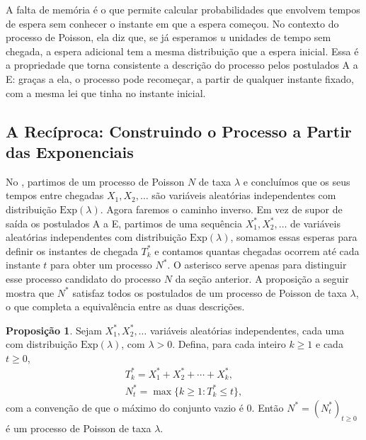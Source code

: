 \documentclass[12pt,portuguese]{article}
\theoremstyle{definition}
\newtheorem{proposition}[proposition]{Proposição}
\theoremstyle{plainexercise}
\theoremstyle{starredexercise}
\theoremstyle{definition}
\begin{document}
A falta de memória é o que permite calcular probabilidades que envolvem
tempos de espera sem conhecer o instante em que a espera começou. No
contexto do processo de Poisson, ela diz que, se já esperamos $u$ unidades de
tempo sem chegada, a espera adicional tem a mesma distribuição que a espera
inicial. Essa é a propriedade que torna consistente a descrição do processo
pelos postulados A a E: graças a ela, o processo pode recomeçar, a partir de
qualquer instante fixado, com a mesma lei que tinha no instante inicial.

\subsection{A Recíproca: Construindo o Processo a Partir das
Exponenciais}\label{subsec:construcao-exponenciais}

No , partimos de um processo de Poisson $N$ de taxa
$\lambda$ e concluímos que os seus tempos entre chegadas $X_1,X_2,\ldots$ são
variáveis aleatórias independentes com distribuição $\mathrm{Exp}(\lambda)$.
Agora faremos o caminho inverso. Em vez de supor de saída os postulados A a E,
partimos de uma sequência $X_1^*,X_2^*,\ldots$ de variáveis aleatórias
independentes com distribuição $\mathrm{Exp}(\lambda)$, somamos essas esperas
para definir os instantes de chegada $T_k^*$ e contamos quantas chegadas
ocorrem até cada instante $t$ para obter um processo $N^*$. O asterisco serve
apenas para distinguir esse processo candidato do processo $N$ da seção
anterior. A proposição a seguir mostra que $N^*$ satisfaz todos os postulados de
um processo de Poisson de taxa $\lambda$, o que completa a equivalência entre as
duas descrições.

\begin{proposition}\label{prop:construcao-poisson}
Sejam $X_1^*,X_2^*,\ldots$ variáveis aleatórias independentes, cada uma com
distribuição $\mathrm{Exp}(\lambda)$, com $\lambda>0$. Defina, para cada
inteiro $k\geqslant1$ e cada $t\geqslant0$,
\begin{gather*}
  T_k^*=X_1^*+X_2^*+\cdots+X_k^*,
  \\[0.2cm]
  N_t^*=\max\{k\geqslant 1 : T_k^*\leqslant t\},
\end{gather*}
com a convenção de que o máximo do conjunto vazio é $0$. Então
$N^*=(N_t^*)_{t\geqslant0}$ é um processo de Poisson de taxa $\lambda$.
\end{proposition}
\end{document}
